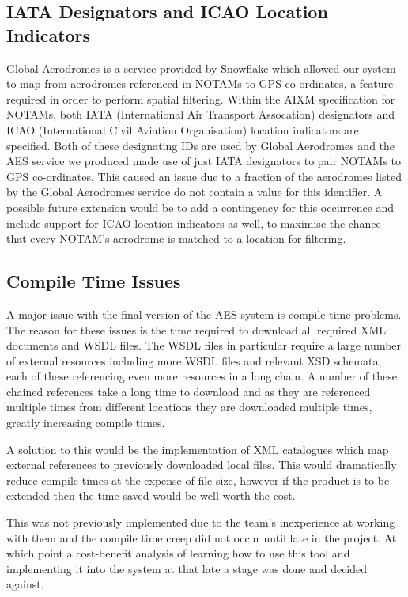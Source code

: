 \documentclass[a4paper, 12pt, twoside]{article}
\begin{document}
\subsection{IATA Designators and ICAO Location Indicators}
\label{sec:future_designators}

Global Aerodromes is a service provided by Snowflake which allowed our system to map from aerodromes referenced in NOTAMs to GPS co-ordinates, a feature required in order to perform spatial filtering. Within the AIXM specification for NOTAMs, both IATA (International Air Transport Assocation) designators and ICAO (International Civil Aviation Organisation) location indicators are specified. Both of these designating IDs are used by Global Aerodromes and the AES service we produced made use of just IATA designators to pair NOTAMs to GPS co-ordinates. This caused an issue due to a fraction of the aerodromes listed by the Global Aerodromes service do not contain a value for this identifier. A possible future extension would be to add a contingency for this occurrence and include support for ICAO location indicators as well, to maximise the chance that every NOTAM's aerodrome is matched to a location for filtering.

\subsection{Compile Time Issues}
\label{sec:future_compilation}

A major issue with the final version of the AES system is compile time problems. The reason for these issues is the time required to download all required XML documents and WSDL files. The WSDL files in particular require a large number of external resources including more WSDL files and relevant XSD schemata, each of these referencing even more resources in a long chain. A number of these chained references take a long time to download and as they are referenced multiple times from different locations they are downloaded multiple times, greatly increasing compile times.

A solution to this would be the implementation of XML catalogues which map external references to previously downloaded local files. This would dramatically reduce compile times at the expense of file size, however if the product is to be extended then the time saved would be well worth the cost.

This was not previously implemented due to the team's inexperience at working with them and the compile time creep did not occur until late in the project. At which point a cost-benefit analysis of learning how to use this tool and implementing it into the system at that late a stage was done and decided against.
\end{document}
